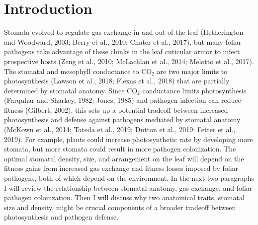 \documentclass[utf8]{frontiersSCNS}
\begin{document}
\hypertarget{introduction}{%
\section*{Introduction}\label{introduction}}

Stomata evolved to regulate gas exchange in and out of the leaf
(Hetherington and Woodward, 2003; Berry et al., 2010; Chater et al.,
2017), but many foliar pathogens take advantage of these chinks in the
leaf cuticular armor to infect prospective hosts (Zeng et al., 2010;
McLachlan et al., 2014; Melotto et al., 2017). The stomatal and
mesophyll conductance to CO\(_2\) are two major limits to photosynthesis
(Lawson et al., 2018; Flexas et al., 2018) that are partially determined
by stomatal anatomy. Since CO\(_2\) conductance limits photosynthesis
(Farquhar and Sharkey, 1982; Jones, 1985) and pathogen infection can
reduce fitness (Gilbert, 2002), this sets up a potential tradeoff
between increased photosynthesis and defense against pathogens mediated
by stomatal anatomy (McKown et al., 2014; Tateda et al., 2019; Dutton et
al., 2019; Fetter et al., 2019). For example, plants could increase
photosynthetic rate by developing more stomata, but more stomata could
result in more pathogen colonization. The optimal stomatal density,
size, and arrangement on the leaf will depend on the fitness gains from
increased gas exchange and fitness losses imposed by foliar pathogens,
both of which depend on the environment. In the next two paragraphs I
will review the relationship between stomatal anatomy, gas exchange, and
foliar pathogen colonization. Then I will discuss why two anatomical
traits, stomatal size and density, might be crucial components of a
broader tradeoff between photosynthesis and pathogen defense.
\end{document}
